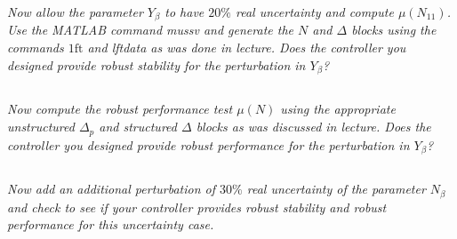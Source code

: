 \documentclass{article}
\begin{document}
\textit{Now allow the parameter $Y_\beta$ to have $20\%$ real uncertainty and compute $\mu\left(N_{11}\right)$. Use the MATLAB command mussv and generate the $N$ and $\Delta$ blocks using the commands $1 \mathrm{ft}$ and lftdata as was done in lecture. Does the controller you designed provide robust stability for the perturbation in $Y_\beta$?}

\subsection{}

\textit{Now compute the robust performance test $\mu(N)$ using the appropriate unstructured $\Delta_p$ and structured $\Delta$ blocks as was discussed in lecture. Does the controller you designed provide robust performance for the perturbation in $Y_\beta$?}

\subsection{}

\textit{Now add an additional perturbation of $30\%$ real uncertainty of the parameter $N_\beta$ and check to see if your controller provides robust stability and robust performance for this uncertainty case.}
\end{document}
